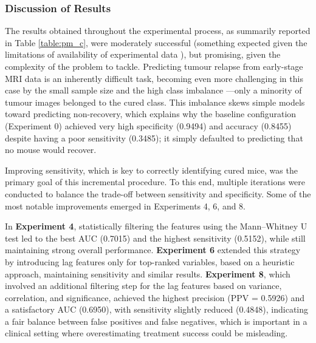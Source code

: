 \documentclass[12pt, a4paper]{report}
\begin{document}
\begin{table}[H]
\centering
\renewcommand{\arraystretch}{1.5} %
\normalsize %
\caption{Configuration 9: Undersampling (ENN)}
\end{table}

\subsubsection{Discussion of Results}

The results obtained throughout the experimental process, as summarily reported in Table \ref{table:pm_c}, were moderately successful (something expected given the limitations of availability of experimental data ), but promising, given the complexity of the problem to tackle. Predicting tumour relapse from early-stage MRI data is an inherently difficult task, becoming even more challenging in this case by the small sample size and the high class imbalance —only a minority of tumour images belonged to the cured class. This imbalance skews simple models toward predicting non-recovery, which explains why the baseline configuration (Experiment 0) achieved very high specificity (0.9494) and accuracy (0.8455) despite having a poor sensitivity (0.3485); it simply defaulted to predicting that no mouse would recover.

Improving sensitivity, which is key to correctly identifying cured mice, was the primary goal of this incremental procedure. To this end, multiple iterations were conducted to balance the trade-off between sensitivity and specificity. Some of the most notable improvements emerged in Experiments 4, 6, and 8.

In \textbf{Experiment 4}, statistically filtering the features using the Mann–Whitney U test led to the best AUC (0.7015) and the highest sensitivity (0.5152), while still maintaining strong overall performance. \textbf{Experiment 6} extended this strategy by introducing lag features only for top-ranked variables, based on a heuristic approach, maintaining sensitivity and similar results. \textbf{Experiment 8}, which involved an additional filtering step for the lag features based on variance, correlation, and significance, achieved the highest precision (PPV = 0.5926) and a satisfactory AUC (0.6950), with sensitivity slightly reduced (0.4848), indicating a fair balance between false positives and false negatives, which is important in a clinical setting where overestimating treatment success could be misleading.
\end{document}
